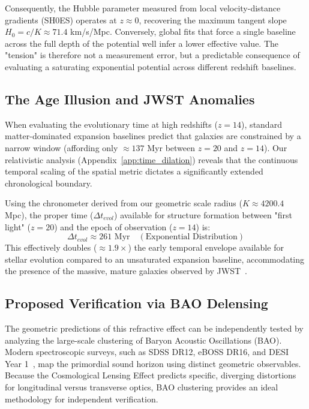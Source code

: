 \documentclass[11pt]{article}
\begin{document}
Consequently, the Hubble parameter measured from local velocity-distance gradients (SH0ES) operates at $z \approx 0$, recovering the maximum tangent slope $H_0 = c/K \approx 71.4$ km/s/Mpc. Conversely, global fits that force a single baseline across the full depth of the potential well infer a lower effective value. The "tension" is therefore not a measurement error, but a predictable consequence of evaluating a saturating exponential potential across different redshift baselines.

\subsection{The Age Illusion and JWST Anomalies}
When evaluating the evolutionary time at high redshifts ($z=14$), standard matter-dominated expansion baselines predict that galaxies are constrained by a narrow window (affording only $\approx 137$ Myr between $z=20$ and $z=14$). Our relativistic analysis (Appendix~\ref{app:time_dilation}) reveals that the continuous temporal scaling of the spatial metric dictates a significantly extended chronological boundary.

Using the chronometer derived from our geometric scale radius ($K \approx 4200.4$ Mpc), the proper time ($\Delta t_{evol}$) available for structure formation between "first light" ($z=20$) and the epoch of observation ($z=14$) is:
\begin{equation}
    \Delta t_{evol} \approx 261 \text{ Myr} \quad (\text{Exponential Distribution})
\end{equation}
This effectively doubles ($\approx 1.9\times$) the early temporal envelope available for stellar evolution compared to an unsaturated expansion baseline, accommodating the presence of the massive, mature galaxies observed by JWST~\cite{Labbe2023}.

\subsection{Proposed Verification via BAO Delensing}
\label{sec:bao_delensing}
The geometric predictions of this refractive effect can be independently tested by analyzing the large-scale clustering of Baryon Acoustic Oscillations (BAO). Modern spectroscopic surveys, such as SDSS DR12, eBOSS DR16, and DESI Year 1~\cite{Alam2021, Adame2024}, map the primordial sound horizon using distinct geometric observables. Because the Cosmological Lensing Effect predicts specific, diverging distortions for longitudinal versus transverse optics, BAO clustering provides an ideal methodology for independent verification.
\end{document}

